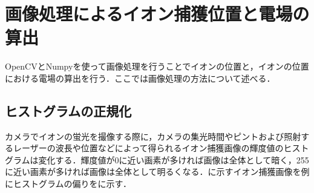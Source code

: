 \section{画像処理によるイオン捕獲位置と電場の算出}
OpenCVとNumpyを使って画像処理を行うことでイオンの位置と，イオンの位置における電場の算出を行う．ここでは画像処理の方法について述べる．
\subsection{ヒストグラムの正規化}
カメラでイオンの蛍光を撮像する際に，カメラの集光時間やピントおよび照射するレーザーの波長や位置などによって得られるイオン捕獲画像の輝度値のヒストグラムは変化する．輝度値が0に近い画素が多ければ画像は全体として暗く，255に近い画素が多ければ画像は全体として明るくなる．に示すイオン捕獲画像を例にヒストグラムの偏りをに示す．
